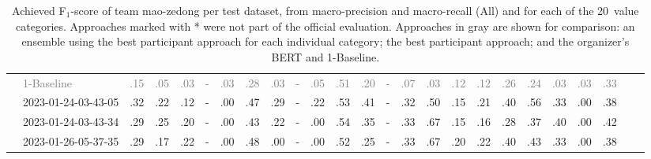 \begin{table*}
\begin{tabular}{@{}ll@{\hspace{10pt}}c@{\hspace{5pt}}cccccccccccccccccccccc@{}}
& \textcolor{gray}{1-Baseline} & \textcolor{gray}{.15} & \textcolor{gray}{.05} & \textcolor{gray}{.03} & \textcolor{gray}{-} & \textcolor{gray}{.03} & \textcolor{gray}{.28} & \textcolor{gray}{.03} & \textcolor{gray}{-} & \textcolor{gray}{.05} & \textcolor{gray}{.51} & \textcolor{gray}{.20} & \textcolor{gray}{-} & \textcolor{gray}{.07} & \textcolor{gray}{.03} & \textcolor{gray}{.12} & \textcolor{gray}{.12} & \textcolor{gray}{.26} & \textcolor{gray}{.24} & \textcolor{gray}{.03} & \textcolor{gray}{.03} & \textcolor{gray}{.33} \\
& 2023-01-24-03-43-05 & .32 & .22 & .12 & - & .00 & .47 & .29 & - & .22 & .53 & .41 & - & .32 & .50 & .15 & .21 & .40 & .56 & .33 & .00 & .38 \\
& 2023-01-24-03-43-34 & .29 & .25 & .20 & - & .00 & .43 & .22 & - & .00 & .54 & .35 & - & .33 & .67 & .15 & .16 & .28 & .37 & .40 & .00 & .42 \\
& 2023-01-26-05-37-35 & .29 & .17 & .22 & - & .00 & .48 & .00 & - & .00 & .52 & .25 & - & .33 & .67 & .20 & .22 & .40 & .43 & .33 & .00 & .38 \\
\bottomrule
\end{tabular}
\caption{Achieved F$_1$-score of team mao-zedong per test dataset, from macro-precision and macro-recall (All) and for each of the 20~value categories. Approaches marked with * were not part of the official evaluation. Approaches in gray are shown for comparison: an ensemble using the best participant approach for each individual category; the best participant approach; and the organizer's BERT and 1-Baseline.}
\label{table-results}
\end{table*}
